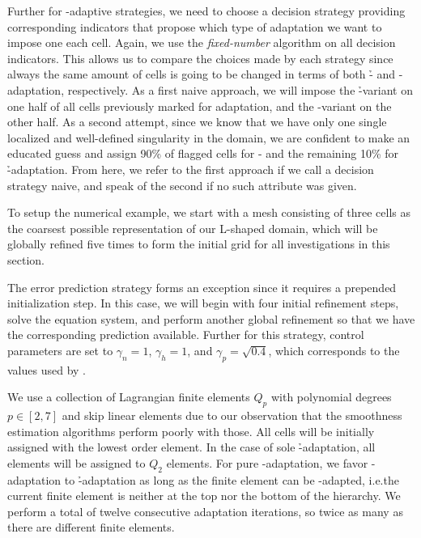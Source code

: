 
Further for \hp-adaptive strategies, we need to choose a decision strategy providing corresponding indicators that propose which type of adaptation we want to impose one each cell.
%
Again, we use the \textit{fixed-number}  algorithm on all decision indicators. This allows us to compare the choices made by each strategy since always the same amount of cells is going to be changed in terms of both \h- and \p-adaptation, respectively.
%
As a first naive approach, we will impose the \h-variant on one half of all cells previously marked for adaptation, and the \p-variant on the other half.
As a second attempt, since we know that we have only one single localized and well-defined singularity in the domain, we are confident to make an educated guess and assign 90\% of flagged cells for \p- and the remaining 10\% for \h-adaptation. From here, we refer to the first approach if we call a decision strategy naive, and speak of the second if no such attribute was given.

To setup the numerical example, we start with a mesh consisting of three cells as the coarsest possible representation of our L-shaped domain, which will be globally refined five times to form the initial grid for all investigations in this section.

The error prediction strategy forms an exception since it requires a prepended initialization step. In this case, we will begin with four initial refinement steps, solve the equation system, and perform another global refinement so that we have the corresponding prediction available. Further for this strategy, control parameters are set to $\gamma_n = 1$, $\gamma_h = 1$, and $\gamma_p = \sqrt{0.4}$, which corresponds to the values used by \textcites{melenk2001}{mitchell2014}.

We use a collection of Lagrangian finite elements $Q_p$ with polynomial degrees $p \in [2,7]$ and skip linear elements due to our observation that the smoothness estimation algorithms perform poorly with those. All cells will be initially assigned with the lowest order element. In the case of sole \h-adaptation, all elements will be assigned to $Q_2$ elements. For pure \p-adaptation, we favor \p-adaptation to \h-adaptation as long as the finite element can be \p-adapted, i.e.\@ the current finite element is neither at the top nor the bottom of the hierarchy. We perform a total of twelve consecutive adaptation iterations, so twice as many as there are different finite elements.

